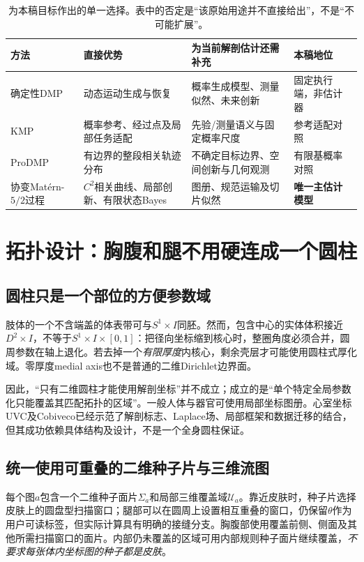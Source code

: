 \documentclass[UTF8,11pt,a4paper,fontset=fandol]{ctexart}
\numberwithin{equation}{section}
\theoremstyle{plain}
\theoremstyle{definition}
\theoremstyle{remark}
\begin{document}
\begin{table}[H]
\centering\small
\caption{为本稿目标作出的单一选择。表中的否定是“该原始用途并不直接给出”，不是“不可能扩展”。}
\begin{tabularx}{\textwidth}{P{22mm}YYY}
\toprule
方法 & 直接优势 & 为当前解剖估计还需补充 & 本稿地位\\
\midrule
确定性DMP & 动态运动生成与恢复 & 概率生成模型、测量似然、未来创新 & 固定执行端，非估计器\\
KMP & 概率参考、经过点及局部任务适配 & 先验/测量语义与固定概率尺度 & 参考适配对照\\
ProDMP & 有边界的整段相关轨迹分布 & 不确定目标边界、空间创新与几何观测 & 有限基概率对照\\
协变Mat\'ern-$5/2$过程 & $C^2$相关曲线、局部创新、有限状态Bayes & 图册、规范运输及切片似然 & \textbf{唯一主估计模型}\\
\bottomrule
\end{tabularx}
\end{table}

\section{拓扑设计：胸腹和腿不用硬连成一个圆柱}\label{sec:topology}
\subsection{圆柱只是一个部位的方便参数域}
肢体的一个不含端盖的体表带可与$S^1\times I$同胚。然而，包含中心的实体体积接近$D^2\times I$，不等于$S^1\times I\times[0,1]$：把径向坐标缩到核心时，整圈角度必须合并，圆周参数在轴上退化。若去掉一个\emph{有限厚度}内核心，剩余壳层才可能使用圆柱式厚化域。零厚度medial axis也不是普通的二维Dirichlet边界面。

因此，“只有二维圆柱才能使用解剖坐标”并不成立；成立的是“单个特定全局参数化只能覆盖其匹配拓扑的区域”。一般人体与器官可使用局部坐标图册。心室坐标UVC及Cobiveco已经示范了解剖标志、Laplace场、局部框架和数据迁移的结合，但其成功依赖具体结构及设计，不是一个全身圆柱保证\cite{Bayer2018,Schuler2021}。

\subsection{统一使用可重叠的二维种子片与三维流图}
每个图$a$包含一个二维种子面片$\Sigma_a$和局部三维覆盖域$\mathcal U_a$。靠近皮肤时，种子片选择皮肤上的圆盘型扫描窗口；腿部可以在圆周上设置相互重叠的窗口，仍保留$\theta$作为用户可读标签，但实际计算具有明确的接缝分支。胸腹部使用覆盖前侧、侧面及其他所需扫描窗口的面片。内部仍未覆盖的区域可用内部规则种子面片继续覆盖，\emph{不要求每张体内坐标图的种子都是皮肤}。
\end{document}
